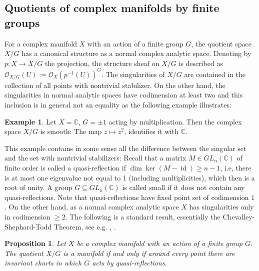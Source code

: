 \documentclass[12pt,reqno]{amsart}
\newtheorem{prop}[thm]{Proposition}
\theoremstyle{definition}
\newtheorem{ex}[thm]{Example}
\newcommand{\C}{\mathbb{C}}
\newcommand{\cX}{\mathcal{X}}
\DeclareMathOperator{\id}{id}
\newcommand{\Oh}{\mathcal{O}}
\begin{document}
\subsection{Quotients of complex manifolds by finite groups}
For a complex manifold $X$ with an action of a finite group $G$, the quotient space $X/G$ has a canonical structure as a normal complex analytic space. Denoting by $p:X\to X/G$ the projection, the structure sheaf on $X/G$ is described as $\Oh_{X/G}(U):=\Oh_{X}(p^{-1}(U))^G$. The singularities of $X/G$ are contained in the collection of all points with nontrivial stabilizer. On the other hand, the singularities in normal analytic spaces have codimension at least two and this inclusion is in general not an equality as the following example illustrates:
\begin{ex}\label{ex: C/pm1}
Let $X=\C$, $G={\pm 1}$ acting by multiplication. Then the complex space $X/G$ is smooth: The map $z\mapsto z^2$, identifies it with $\C$.
\end{ex}

This example contains in some sense all the difference between the singular set and the set with nontrivial stabilizers: Recall that a matrix $M\in GL_n(\C)$ of finite order is called a quasi-reflection if $\dim\ker (M-\id)\geq n-1$, i.e, there is at most one eigenvalue not equal to 1 (including multiplicities), which then is a root of unity. A group $G\subseteq GL_n(\C)$ is called small if it does not contain any quasi-reflections. Note that quasi-reflections have fixed point set of codimension $1$. On the other hand, as a normal complex analytic space $X$ has singularities only in codimension $\geq 2$.
The following is a standard result, essentially the Chevalley-Shephard-Todd Theorem, see e.g. \cite[§7.2]{Ben93}, \cite{BG08}. 

\begin{prop}\label{prop: quasi-reflections}
    Let $X$ be a complex manifold with an action of a finite group $G$. The quotient $X/G$ is a manifold if and only if around every point there are invariant charts in which $G$ acts by quasi-reflections.
\end{prop}

\end{document}
